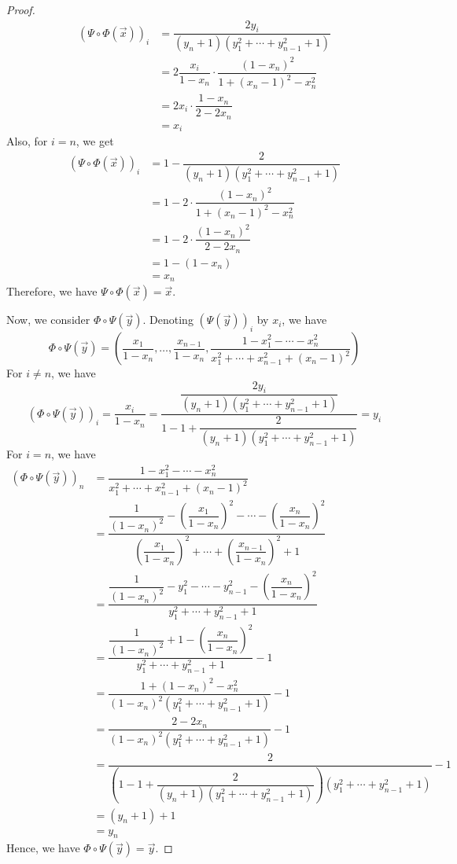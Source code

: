 \documentclass{article}
\theoremstyle{plain} %
\numberwithin{thm}{section} %
\theoremstyle{definition} %
\begin{document}
\begin{proof}
\begin{align*}
    (\Psi \circ \Phi (\vec{x}))_i 
    &= \dfrac{2y_i}{(y_n + 1)(y_1^2 + \cdots + y_{n - 1}^2 + 1)} \\
    &= 2\dfrac{x_i}{1 - x_n} \cdot \dfrac{(1 - x_n)^2}{1 + (x_n - 1)^2 - x_n^2} \\
    &= 2x_i \cdot \dfrac{1 - x_n}{2 - 2x_n} \\
    &= x_i
\end{align*}
Also, for $i = n$, we get
\begin{align*}
    (\Psi \circ \Phi (\vec{x}))_i 
    &= 1 - \dfrac{2}{(y_n + 1)(y_1^2 + \cdots + y_{n - 1}^2 + 1)} \\
    &= 1 - 2\cdot\dfrac{(1 - x_n)^2}{1 + (x_n - 1)^2 - x_n^2} \\
    &= 1 - 2\cdot\dfrac{(1 - x_n)^2}{2 - 2x_n} \\
    &= 1 - (1 - x_n) \\
    &= x_n
\end{align*}
Therefore, we have $\Psi \circ \Phi(\vec{x}) = \vec{x}$.

Now, we consider $\Phi \circ \Psi (\vec{y})$. Denoting $(\Psi(\vec{y}))_i$ by $x_i$, we have
\[
    \Phi \circ \Psi (\vec{y}) = \left(\dfrac{x_1}{1 - x_n}, \dots, \dfrac{x_{n - 1}}{1 - x_n}, \dfrac{1 - x_1^2 - \cdots - x_n^2}{x_1^2 + \cdots + x_{n - 1}^2 + (x_n - 1)^2}\right)
\]
For $i \neq n$, we have
\[
    (\Phi \circ \Psi(\vec{y}))_i = \dfrac{x_i}{1 - x_n} = \dfrac{\dfrac{2y_i}{(y_n + 1)(y_1^2 + \cdots + y_{n - 1}^2 + 1)}}{1 - 1 + \dfrac{2}{(y_n + 1)(y_1^2 + \cdots + y_{n - 1}^2 + 1)}} = y_i
\]
For $i = n$, we have
\begin{align*}
    (\Phi \circ \Psi(\vec{y}))_n
    &= \dfrac{1 - x_1^2 - \cdots - x_n^2}{x_1^2 + \cdots + x_{n - 1}^2 + (x_n - 1)^2} \\
    &= \dfrac{\dfrac{1}{(1 - x_n)^2} - \left(\dfrac{x_1}{1 - x_n}\right)^2 - \cdots - \left(\dfrac{x_n}{1 - x_n}\right)^2}{\left(\dfrac{x_1}{1 - x_n}\right)^2 + \cdots + \left(\dfrac{x_{n - 1}}{1 - x_n}\right)^2 + 1} \\
    &= \dfrac{\dfrac{1}{(1 - x_n)^2} - y_1^2 - \cdots - y_{n - 1}^2 - \left(\dfrac{x_n}{1 - x_n}\right)^2}{y_1^2 + \cdots + y_{n - 1}^2 + 1} \\
    &= \dfrac{\dfrac{1}{(1 - x_n)^2} + 1 - \left(\dfrac{x_n}{1 - x_n}\right)^2}{y_1^2 + \cdots + y_{n - 1}^2 + 1} - 1 \\
    &= \dfrac{1 + (1 - x_n)^2 - x_n^2}{(1 - x_n)^2(y_1^2 + \cdots + y_{n - 1}^2 + 1)} - 1 \\
    &= \dfrac{2 - 2x_n}{(1 - x_n)^2(y_1^2 + \cdots + y_{n - 1}^2 + 1)} - 1 \\
    &= \dfrac{2}{\left(1 - 1 + \dfrac{2}{(y_n + 1)(y_1^2 + \cdots + y_{n - 1}^2 + 1)}\right)(y_1^2 + \cdots + y_{n - 1}^2 + 1)} - 1 \\
    &= (y_n + 1) + 1\\
    &= y_n
\end{align*}
Hence, we have $\Phi \circ \Psi (\vec{y}) = \vec{y}$.


\end{proof}
\end{document}
